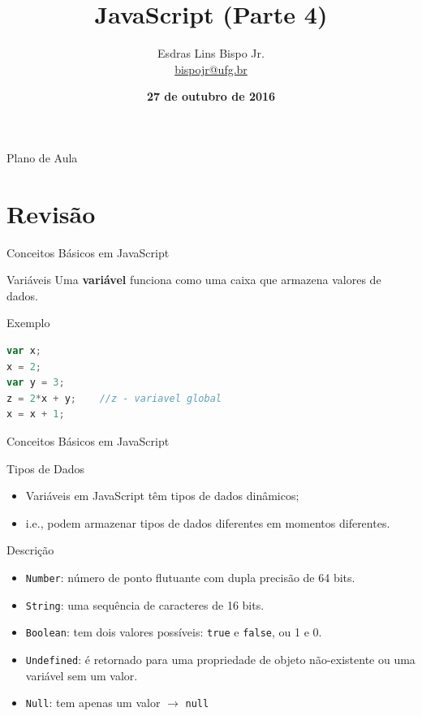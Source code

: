 \documentclass[xcolor=dvipsnames,table]{beamer}
\title{JavaScript (Parte 4)}
\author{
  Esdras Lins Bispo Jr. \\ \url{bispojr@ufg.br}
  }
\institute{
  Física para Ciência da Computação \\Bacharelado em Ciência da Computação}
\date{\textbf{27 de outubro de 2016} }
\begin{document}
	\begin{frame}
		\titlepage
	\end{frame}

	\AtBeginSection{
		\begin{frame}{Sumário}%
    		\tableofcontents[currentsection]
		\end{frame}
	}

	\begin{frame}{Plano de Aula}
		\tableofcontents
	\end{frame}

\section{Revisão}

\begin{frame}[fragile]{Conceitos Básicos em JavaScript}
	\begin{block}{Variáveis}
		Uma {\bf variável} funciona como uma caixa que armazena valores de dados.
	\end{block}
	\begin{block}{Exemplo}
		\begin{lstlisting}[language=JavaScript]
var x;
x = 2;
var y = 3;
z = 2*x + y;	//z - variavel global
x = x + 1;
\end{lstlisting}	
	\end{block}
\end{frame}

\begin{frame}[fragile]{Conceitos Básicos em JavaScript}
	\begin{block}{Tipos de Dados}
		\begin{itemize}
			\item Variáveis em JavaScript têm tipos de dados dinâmicos;
			\item i.e., podem armazenar tipos de dados diferentes em momentos diferentes.
		\end{itemize}
	\end{block}
	\begin{block}{Descrição}
		\begin{itemize}
			\item {\tt Number}: número de ponto flutuante com dupla precisão de 64 bits.
			\item {\tt String}: uma sequência de caracteres de 16 bits.
			\item {\tt Boolean}: tem dois valores possíveis: {\tt true} e {\tt false}, ou 1 e 0.
			\item {\tt Undefined}: é retornado para uma propriedade de objeto não-existente ou uma variável sem um valor.
			\item {\tt Null}: tem apenas um valor $\rightarrow$ {\tt null}
		\end{itemize}	
	\end{block}
\end{frame}
\end{document}
